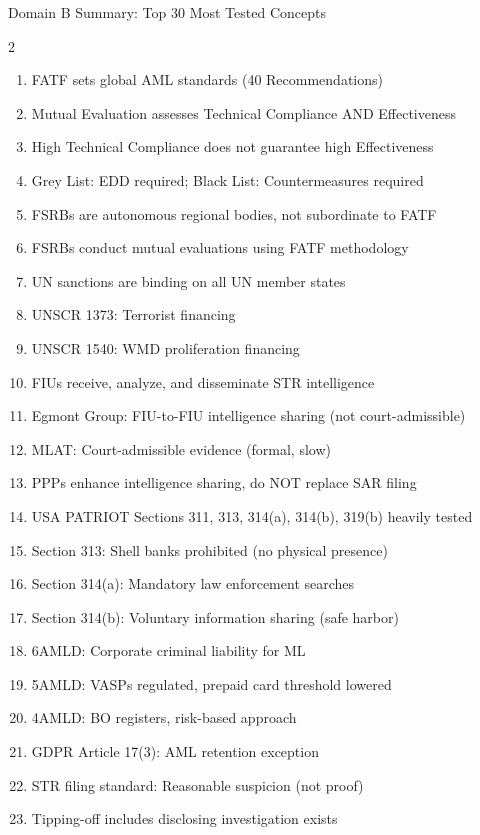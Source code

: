 \documentclass[11pt,a4paper]{beamer}
\begin{document}
	\begin{frame}{Domain B Summary: Top 30 Most Tested Concepts}
		\begin{multicols}{2}
			\begin{enumerate}
				\item FATF sets global AML standards (40 Recommendations)
				\item Mutual Evaluation assesses Technical Compliance AND Effectiveness
				\item High Technical Compliance does not guarantee high Effectiveness
				\item Grey List: EDD required; Black List: Countermeasures required
				\item FSRBs are autonomous regional bodies, not subordinate to FATF
				\item FSRBs conduct mutual evaluations using FATF methodology
				\item UN sanctions are binding on all UN member states
				\item UNSCR 1373: Terrorist financing
				\item UNSCR 1540: WMD proliferation financing
				\item FIUs receive, analyze, and disseminate STR intelligence
				\item Egmont Group: FIU-to-FIU intelligence sharing (not court-admissible)
				\item MLAT: Court-admissible evidence (formal, slow)
				\item PPPs enhance intelligence sharing, do NOT replace SAR filing
				\item USA PATRIOT Sections 311, 313, 314(a), 314(b), 319(b) heavily tested
				\item Section 313: Shell banks prohibited (no physical presence)
				\item Section 314(a): Mandatory law enforcement searches
				\item Section 314(b): Voluntary information sharing (safe harbor)
				\item 6AMLD: Corporate criminal liability for ML
				\item 5AMLD: VASPs regulated, prepaid card threshold lowered
				\item 4AMLD: BO registers, risk-based approach
				\item GDPR Article 17(3): AML retention exception
				\item STR filing standard: Reasonable suspicion (not proof)
				\item Tipping-off includes disclosing investigation exists

\end{enumerate}
\end{multicols}
\end{frame}
\end{document}
